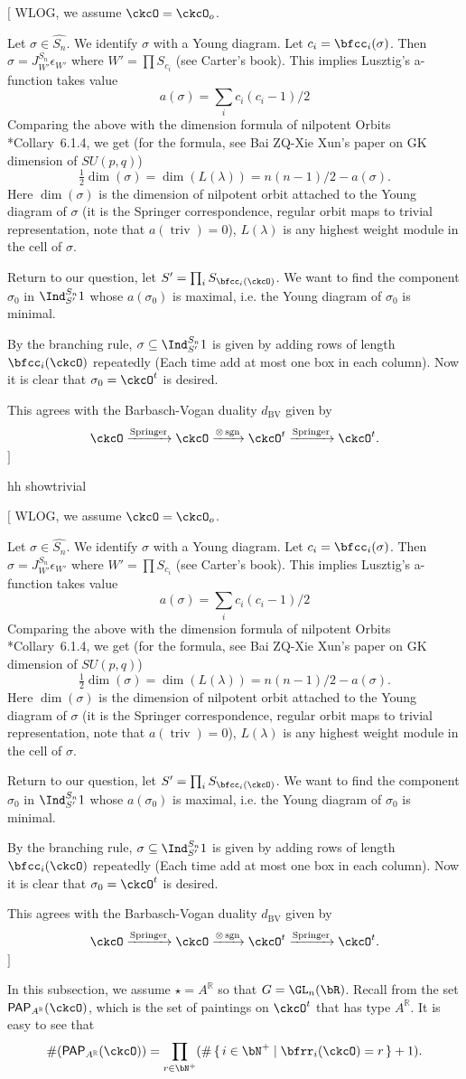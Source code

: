 \documentclass[12pt,a4paper]{amsart}
\newcommand{\trivial}[2][]{\if\relax\detokenize{#1}\relax
  {%
      \color{orange} \vspace{0em} $[$  #2 $]$
      \color{black}
  }
  \else
\ifx#1h
\ifcsname showtrivial\endcsname
{%
    \color{orange} \vspace{0em}  $[$ #2 $]$
    \color{black}
}
\fi
\else {\red Wrong argument!} \fi
\fi
}
\def\subset{\subseteq}
\def\Im{\operatorname{Im}}
\def\abs#1{\left|{#1}\right|}
\newcommand{\sgn}{\operatorname{sgn}}
\newcommand{\triv}{\operatorname{triv}}
\newcommand{\R}{\mathbb R}
\numberwithin{equation}{section}
\theoremstyle{remark}
\def\half{{\tfrac{1}{2}}}
\def\dBV{d_{\mathrm{BV}}}
\def\lamck{\lambda_\ckcO}
\def\Wint#1{W_{[#1]}}
\def\PP{\mathsf{PAP}}
\def\Im{\mathrm{Im}}
\def\Spr{\mathrm{Springer}}
\begin{document}
\trivial[h]{ WLOG, we assume $\ckcO = \ckcO_o$.

  Let $\sigma\in \widehat{S_n}$. We identify $\sigma$ with a Young diagram. Let
  $c_i = \bfcc_i(\sigma)$. Then $\sigma = J^{S_n}_{W'} \epsilon_{W'}$ where
  $W' = \prod S_{c_i}$ (see Carter's book). This implies Lusztig's a-function
  takes value
  \[
    a(\sigma) = \sum_i c_i(c_i-1) /2
  \]
  Comparing the above with the dimension formula of nilpotent Orbits
  \cite{CM}*{Collary~6.1.4}, we get (for the formula, see Bai ZQ-Xie Xun's paper
  on GK dimension of $SU(p,q)$)
  \[
    \half \dim(\sigma) = \dim(L(\lambda)) = n(n-1)/2 - a(\sigma).
  \]
  Here $\dim(\sigma)$ is the dimension of nilpotent orbit attached to the Young
  diagram of $\sigma$ (it is the Springer correspondence, regular orbit maps to
  trivial representation, note that $a(\triv)=0$), $L(\lambda)$ is any highest
  weight module in the cell of $\sigma$.


  Return to our question, let $S' = \prod_i S_{\bfcc_i(\ckcO)}$. We want to find
  the component $\sigma_0$ in $\Ind_{S'}^{S_n} 1$ whose $a(\sigma_0)$ is
  maximal, i.e. the Young diagram of $\sigma_0$ is minimal.

  By the branching rule, $\sigma \subset \Ind_{S'}^{S_n} 1$ is given by adding
  rows of length $\bfcc_i(\ckcO)$ repeatedly (Each time add at most one box in
  each column). Now it is clear that $\sigma_0 = \ckcO^t$ is desired.

  This agrees with the Barbasch-Vogan duality $\dBV$ given by
  \[
    \ckcO \xrightarrow{\Spr}\ckcO \xrightarrow{\otimes \sgn} \ckcO^t \xrightarrow{\Spr} \ckcO^t.
  \]
}

In this subsection, we assume  $\star=A^\R$ so that $G = \GL_{n}(\bR)$.
Recall from  the set $\PP_{A^\R}(\ckcO)$, which is the set of paintings on $\ckcO^{t}$ that has type $A^\R$.
It is easy to see that
\begin{equation}\label{eq:PPA.count}
  \#(\PP_{A^\R}(\ckcO)) = \prod_{r\in \bN^{+}} (\#\set{i\in \bN^{+}| \bfrr_{i}(\ckcO)=r}+1).
\end{equation}
\end{document}
